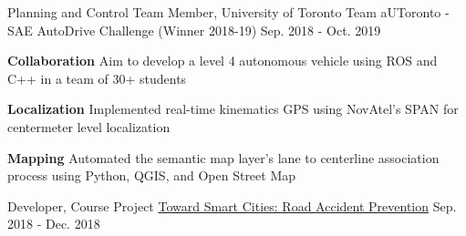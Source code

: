 \begin{cventries}
	\cventry
	{Planning and Control Team Member, University of Toronto Team}
	{aUToronto - SAE AutoDrive Challenge (Winner 2018-19)}
	{Sep. 2018 - Oct. 2019}
	{}
	{
		\begin{cvitems}
			\item {\textbf{Collaboration} Aim to develop a level 4 autonomous vehicle using ROS and C++ in a team of 30+ students}
			\item {\textbf{Localization} Implemented real-time kinematics GPS using NovAtel's SPAN for centermeter level localization
			}
			\item {\textbf{Mapping} Automated the semantic map layer's lane to centerline association process using Python, QGIS, and Open Street Map}
		\end{cvitems}
	}
	\cventry
	{Developer, Course Project}
	{\href{https://github.com/rhklite/traffic_accident_prediction}{Toward Smart Cities: Road Accident Prevention}}
	{Sep. 2018 - Dec. 2018}
	{}
	{
		\begin{cvitems}

\end{cvitems}}
\end{cventries}
